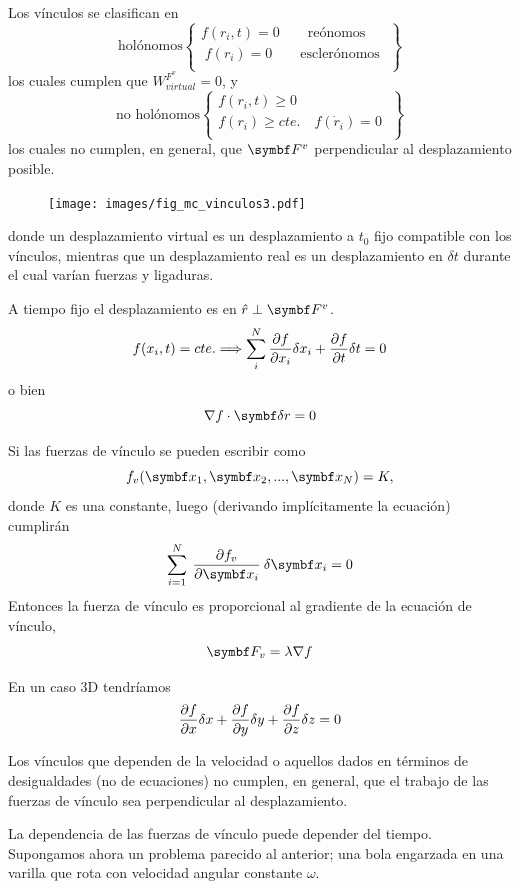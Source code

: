 \documentclass[10pt,oneside]{CBFT_book}
\begin{document}
Los vínculos se clasifican en
\[
\textrm{holónomos} 
\begin{Bmatrix}
 f(r_i,t) = 0 \qquad \textrm{reónomos} \\
\; f(r_i) = 0 \qquad \textrm{esclerónomos} \;\\
\end{Bmatrix} 
\]
los cuales cumplen que  $W_{virtual}^{F^v}=0$, y
\[
\textrm{no holónomos} 
\begin{Bmatrix}
 f(r_i,t) \geq 0  \\
 f(r_i) \geq cte. \quad f(\dot{r}_i) = 0  \; \\
\end{Bmatrix}
\]
los cuales no cumplen, en general, que $\vb{F}^v$ perpendicular al desplazamiento posible.
\begin{figure}[hbt]
	\begin{center}
	\texttt{[image: images/fig\_mc\_vinculos3.pdf]}	
	\end{center}
	\caption{}
\end{figure} 
donde un desplazamiento virtual es un desplazamiento a $t_0$ fijo compatible con los vínculos,
mientras que un desplazamiento real es un desplazamiento en $\delta t$ durante el cual varían
fuerzas y ligaduras.

A tiempo fijo el desplazamiento es en $\hat{r} \perp \vb{F}^v$.
\[
	f(x_i,t) = cte. \Longrightarrow \sum_i^N \frac{\partial^{\hspace{-0.05em}} {f}}{\partial {x_i}^{\hspace{-0.05em}}} \delta x_i + \frac{\partial^{\hspace{-0.05em}} {f}}{\partial {t}^{\hspace{-0.05em}}} \delta t = 0 
\]
o bien
\[
	\nabla f \cdot \vb{\delta r} = 0
\]

Si las fuerzas de vínculo se pueden escribir como 
\[
	f_v(\vb{x}_1, \vb{x}_2, ..., \vb{x}_N ) = K,
\]
donde $K$ es una constante, luego (derivando implícitamente la ecuación) cumplirán
\[
	\sum_{i=1}^N \: \dpar{f_v}{\vb{x}_i}\:\delta{\vb{x}_i} = 0
\]
Entonces la fuerza de vínculo es proporcional al gradiente de la ecuación de vínculo,
\[
	\vb{F}_v = \lambda \nabla f
\]

En un caso 3D tendríamos
\[
	\frac{\partial^{\hspace{-0.05em}} {f}}{\partial {x}^{\hspace{-0.05em}}}\delta x + \frac{\partial^{\hspace{-0.05em}} {f}}{\partial {y}^{\hspace{-0.05em}}}\delta y + \frac{\partial^{\hspace{-0.05em}} {f}}{\partial {z}^{\hspace{-0.05em}}}\delta z = 0
\]

Los vínculos que dependen de la velocidad o aquellos dados en términos de desigualdades (no de ecuaciones) no cumplen,
en general, que el trabajo de las fuerzas de vínculo sea perpendicular al desplazamiento.

La dependencia de las fuerzas de vínculo puede depender del tiempo. Supongamos ahora un problema parecido al anterior; 
una bola engarzada en una varilla que rota con velocidad angular constante $\omega$.
\end{document}
